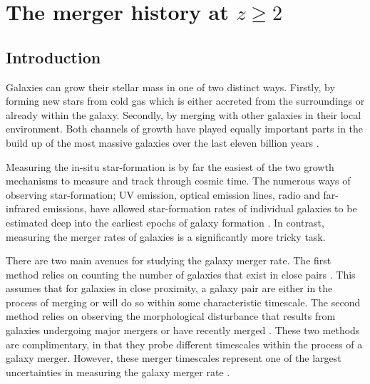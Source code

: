 \chapter{The merger history at $z \geq 2$}\label{ch:mergers}

\section{Introduction}
Galaxies can grow their stellar mass in one of two distinct ways. Firstly, by forming new stars from cold gas which is either accreted from the surroundings or already within the galaxy. Secondly, by merging with other galaxies in their local environment. Both channels of growth have played equally important parts in the build up of the most massive galaxies over the last eleven billion years \citep{Bundy:2009jw,Bridge:2010ft,Ownsworth:2014gt}.
%

Measuring the in-situ star-formation is by far the easiest of the two growth mechanisms to measure and track through cosmic time. The numerous ways of observing star-formation; UV emission, optical emission lines, radio and far-infrared emissions, have allowed star-formation rates of individual galaxies to be estimated deep into the earliest epochs of galaxy formation \citep{Hopkins:2006bq,Behroozi:2013fg,2015ApJ...803...34B}. In contrast, measuring the merger rates of galaxies is a significantly more tricky task. 

There are two main avenues for studying the galaxy merger rate. The first method relies on counting the number of galaxies that exist in close pairs \citep{Patton:2000kt}. This assumes that for galaxies in close proximity, a galaxy pair are either in the process of merging or will do so within some characteristic timescale. The second method relies on observing the morphological disturbance that results from galaxies undergoing major mergers or have recently merged \citep{Conselice:2003jz}. These two methods are complimentary, in that they probe different timescales within the process of a galaxy merger. However, these merger timescales represent one of the largest uncertainties in measuring the galaxy merger rate  \citep{Kitzbichler:2008gi,Conselice:2009bi,Lotz:2010ie,Lotz:2010hf,Hopkins:2010ip}.

